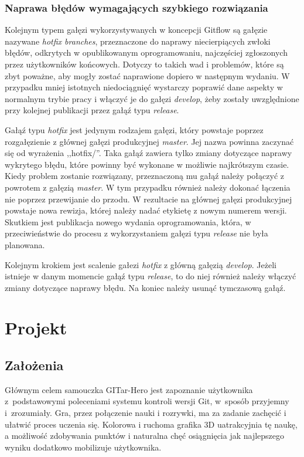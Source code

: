 \documentclass[11pt,a4paper,polish,thesis]{dcsbook}
\begin{document}
	\subsection{Naprawa błędów wymagających szybkiego rozwiązania}
	
	Kolejnym typem gałęzi wykorzystywanych w koncepcji Gitflow są gałęzie nazywane \textit{hotfix branches}, przeznaczone do naprawy niecierpiących zwłoki błędów, odkrytych w opublikowanym oprogramowaniu, najczęściej zgłoszonych przez użytkowników końcowych. Dotyczy to takich wad i problemów, które są zbyt poważne, aby mogły zostać naprawione dopiero w następnym wydaniu. W przypadku mniej istotnych niedociągnięć wystarczy poprawić dane aspekty w normalnym trybie pracy i włączyć je do gałęzi \textit{develop}, żeby zostały uwzględnione przy kolejnej publikacji przez gałąź typu \textit{release}. 
	
	Gałąź typu \textit{hotfix} jest jedynym rodzajem gałęzi, który powstaje poprzez rozgałęzienie z głównej gałęzi produkcyjnej \textit{master}. Jej nazwa powinna zaczynać się od wyrażenia ,,hotfix/''. Taka gałąź zawiera tylko zmiany dotyczące naprawy wykrytego błędu, które powinny być wykonane w możliwie najkrótszym czasie. Kiedy problem zostanie rozwiązany, przeznaczoną mu gałąź należy połączyć z powrotem z gałęzią \textit{master}. W tym przypadku również należy dokonać łączenia nie poprzez przewijanie do przodu. W rezultacie na głównej gałęzi produkcyjnej powstaje nowa rewizja, której należy nadać etykietę z nowym numerem wersji. Skutkiem jest publikacja nowego wydania oprogramowania, która, w przeciwieństwie do procesu z wykorzystaniem gałęzi typu \textit{release} nie była planowana. 
	
	Kolejnym krokiem jest scalenie gałezi \textit{hotfix} z główną gałęzią \textit{develop}. Jeżeli istnieje w danym momencie gałąź typu \textit{release}, to do niej również należy włączyć zmiany dotyczące naprawy błędu. Na koniec należy usunąć tymczasową gałąź.
	
	\chapter{Projekt}
	
	\section{Założenia}
		
	Głównym celem samouczka GITar-Hero jest zapoznanie użytkownika z~podstawowymi poleceniami systemu kontroli wersji Git, w~sposób przyjemny i~zrozumiały. Gra, przez połączenie nauki i rozrywki, ma za zadanie zachęcić i ułatwić proces uczenia się. Kolorowa i ruchoma grafika 3D uatrakcyjnia tę naukę, a możliwość zdobywania punktów i naturalna chęć osiągnięcia jak najlepszego wyniku dodatkowo mobilizuje użytkownika. 
	
\end{document}
